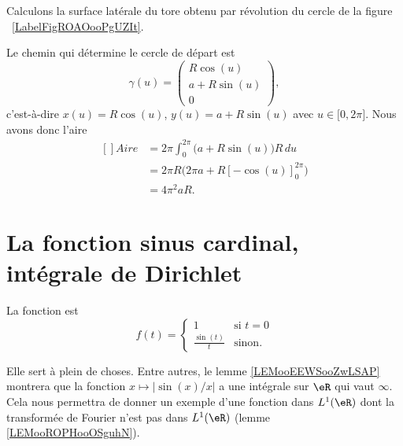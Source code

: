 \begin{example}
    Calculons la surface latérale du tore obtenu par révolution du cercle de la figure ~\ref{LabelFigROAOooPgUZIt}. %
\newcommand{\CaptionFigROAOooPgUZIt}{Si nous tournons ce cercle autour de l'axe $X$, nous obtenons un tore de rayon «externe» $a$ et de rayon «interne» $R$.}


    Le chemin qui détermine le cercle de départ est
    \begin{equation}
        \gamma(u)=\begin{pmatrix}
            R\cos(u)    \\
            a+R\sin(u)    \\
            0
        \end{pmatrix},
    \end{equation}
    c'est-à-dire $x(u)=R\cos(u)$, $y(u)=a+R\sin(u)$ avec $u\in\mathopen[ 0 , 2\pi \mathclose]$. Nous avons donc l'aire
    \begin{equation}
        \begin{aligned}[]
            Aire&=2\pi\int_0^{2\pi}\big( a+R\sin(u) \big)R\,du\\
            &=2\pi R\big( 2\pi a+R[-\cos(u)]_0^{2\pi} \big)\\
            &=4\pi^2aR.
        \end{aligned}
    \end{equation}
\end{example}

\section{La fonction sinus cardinal, intégrale de Dirichlet}

\begin{definition}
    La fonction  est
    \begin{equation}
        f(t)=\begin{cases}
            1    &   \text{si } t=0 \\
            \frac{ \sin(t) }{ t }    &    \text{sinon. }
        \end{cases}
    \end{equation}
\end{definition}
Elle sert à plein de choses. Entre autres, le lemme \ref{LEMooEEWSooZwLSAP} montrera que la fonction \( x\mapsto | \sin(x)/x |\) a une intégrale sur \( \eR\) qui vaut \( \infty\). Cela nous permettra de donner un exemple d'une fonction dans \( L^1(\eR)\) dont la transformée de Fourier n'est pas dans \( L^1(\eR)\) (lemme \ref{LEMooROPHooOSguhN}).

